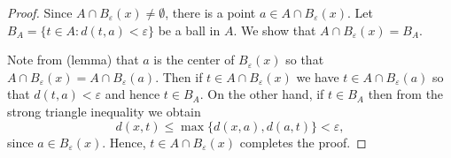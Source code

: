 \begin{proof}
Since \( A \cap B_{\varepsilon } (x) \neq \emptyset  \), there is a point \( a \in A \cap B_{\varepsilon } (x) \). Let \( B_{A} = \{ t \in A : d(t,a) < \varepsilon  \}  \) be a ball in \( A \). We show that \( A \cap B_{\varepsilon } (x) = B_{A}  \).

Note from (lemma) that \( a \) is the center of \( B_{\varepsilon } (x) \) so that \( A \cap B_{\varepsilon } (x) = A \cap B_{\varepsilon } (a) \). Then if \( t \in A \cap B_{\varepsilon } (x) \) we have \( t \in A \cap B_{\varepsilon } (a) \) so that \( d(t, a) < \varepsilon  \) and hence \( t \in B_{A} \). On the other hand, if \( t \in B_{A}  \) then from the strong triangle inequality we obtain \[ d(x, t) \leq \max \{ d(x,a), d(a,t) \} < \varepsilon , \] since \( a \in B_{\varepsilon } (x) \). Hence, \( t \in A \cap B_{\varepsilon } (x) \) completes the proof.
\end{proof}
\begin{comment}
Since \( A \cap B \neq \emptyset \) there is a point \( a \in A \cap B \). Write \( B = B_{\varepsilon } (x) \) for some \( x \in X \) and \( \varepsilon > 0 \). To show that \( A \cap B \) is a ball in \( A \), we must find a radius \( r > 0 \) such that for every \( t \in A \cap B\), \( d(a,t) < r \). Set \( r = \varepsilon  \) and fix \( t \in A \cap B \). Then \( a, t \in B \) so that \( d(a,x) < \varepsilon  \) and \( d(t,x) < \varepsilon  \). Using the strong triangle inequality, \[ d(a,t) \leq \max \{ d(a,x) , d(t,x) \} < \varepsilon = r. \] Therefore, \( A \cap B \) is a ball in \( A \).
\end{comment}

